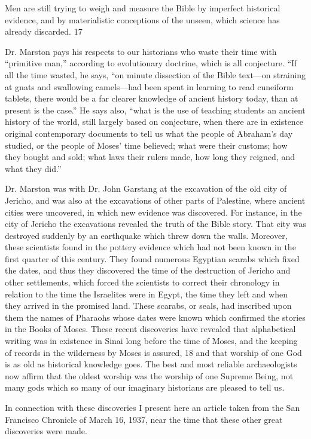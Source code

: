 Men are still trying to weigh and measure the Bible by imperfect historical evidence, and by
materialistic conceptions of the unseen, which science has already discarded. 17

Dr. Marston pays his respects to our historians who waste their time with ``primitive man,''
according to evolutionary doctrine, which is all conjecture. ``If all the time wasted, he says,
``on minute dissection of the Bible text—on straining at gnats and swallowing camels—had
been spent in learning to read cuneiform tablets, there would be a far clearer knowledge of
ancient history today, than at present is the case.'' He says also, ``what is the use of teaching
students an ancient history of the world, still largely based on conjecture, when there are in
existence original contemporary documents to tell us what the people of Abraham's day
studied, or the people of Moses' time believed; what were their customs; how they bought
and sold; what laws their rulers made, how long they reigned, and what they did.''

Dr. Marston was with Dr. John Garstang at the excavation of the old city of Jericho, and was
also at the excavations of other parts of Palestine, where ancient cities were uncovered, in
which new evidence was discovered. For instance, in the city of Jericho the excavations
revealed the truth of the Bible story. That city was destroyed suddenly by an earthquake
which threw down the walls. Moreover, these scientists found in the pottery evidence which
had not been known in the first quarter of this century. They found numerous Egyptian
scarabs which fixed the dates, and thus they discovered the time of the destruction of Jericho
and other settlements, which forced the scientists to correct their chronology in relation to the
time the Israelites were in Egypt, the time they left and when they arrived in the promised
land. These scarabs, or seals, had inscribed upon them the names of Pharaohs whose dates
were known which confirmed the stories in the Books of Moses. These recent discoveries
have revealed that alphabetical writing was in existence in Sinai long before the time of
Moses, and the keeping of records in the wilderness by Moses is assured, 18 and that worship
of one God is as old as historical knowledge goes. The best and most reliable archaeologists
now affirm that the oldest worship was the worship of one Supreme Being, not many gods
which so many of our imaginary historians are pleased to tell us.

In connection with these discoveries I present here an article taken from the San Francisco
Chronicle of March 16, 1937, near the time that these other great discoveries were made.


